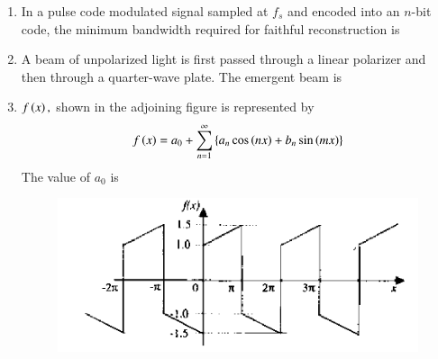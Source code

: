 \documentclass[journal,12pt,onecolumn]{IEEEtran}
\theoremstyle{remark}
\begin{document}
\begin{enumerate}
\hfill{}

\begin{enumerate}
\end{enumerate}

\item In a pulse code modulated  signal sampled at $f_s$ and encoded into an $n$-bit code, the minimum bandwidth required for faithful reconstruction is

\hfill{}
\begin{enumerate}
\end{enumerate}

\item A beam of unpolarized light is first passed through a linear polarizer and then through a quarter-wave plate. The emergent beam is

\hfill{}
\begin{enumerate}
\end{enumerate}

\item $f\left(x\right),$ shown in the adjoining figure is represented by
\begin{align*}
f\left(x\right) = a_0 + \sum_{n=1}^{\infty}\left\{a_n \cos\left(nx\right) + b_n \sin\left(mx\right)\right\}
\end{align*}
The value of $a_0$ is
\begin{figure}[H]
    \centering
    \includegraphics[width=0.7\columnwidth]{q10}
    \caption*{}
    \label{fig:Q10}
\end{figure}


\end{enumerate}
\end{document}

